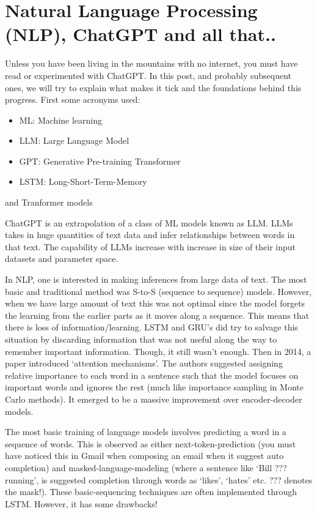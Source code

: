 \documentclass[11pt]{article}
\begin{document}
\section{Natural Language Processing (NLP), ChatGPT and all that..}

Unless you have been living in the mountains with no internet, you must have read 
or experimented with ChatGPT. In this post, and probably subsequent ones, we will try to explain 
what makes it tick and the foundations behind this progress. First some acronyms used:

\begin{itemize}
\item ML: Machine learning
\item LLM: Large Language Model
\item GPT: Generative Pre-training Transformer
\item LSTM: Long-Short-Term-Memory
\end{itemize}

and Tranformer models


ChatGPT is an extrapolation of a class of ML models known as LLM. LLMs takes in 
huge quantities of text data and infer relationships between words in that text. 
The capability of LLMs increase with increase in size of their input datasets and parameter space. 


In NLP, one is interested in making inferences from large data of text. 
The most basic and traditional method was S-to-S (sequence to sequence) models. 
However, when we have large amount of text this was not optimal since the model 
forgets the learning from the earlier parts as it moves along a sequence. This means 
that there is loss of information/learning. LSTM and GRU's did try to salvage this situation 
by discarding information that was not useful along the way to remember important information. 
Though, it still wasn’t enough. Then in 2014, a paper introduced `attention mechanisms'. 
The authors suggested assigning relative importance to each word in a sentence such that the 
model focuses on important words and ignores the rest (much like importance sampling in Monte Carlo methods). 
It emerged to be a massive improvement over encoder-decoder models. 


The most basic training of language models involves predicting a word in a 
sequence of words. This is observed as either next-token-prediction (you must have noticed this in Gmail when composing an email when it suggest auto completion) 
and masked-language-modeling (where a sentence like `Bill ??? running', is suggested completion through words as `likes', `hates' etc. ??? denotes the mask!). 
These basic-sequencing techniques are often implemented through LSTM. However, it has some drawbacks! 
\end{document}
